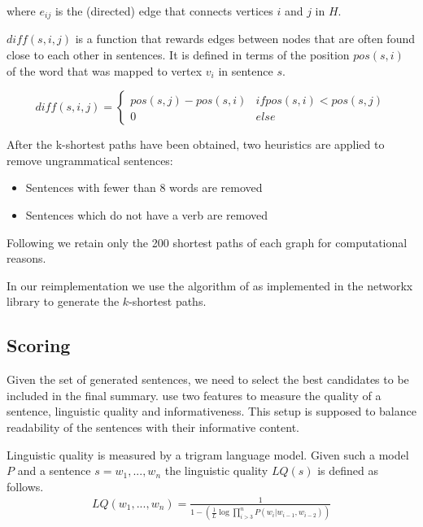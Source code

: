 \documentclass[a4paper,BCOR=10mm]{report}
\numberwithin{lemma}{chapter}
\numberwithin{definition}{chapter}
\begin{document}
where $e_{ij}$ is the (directed) edge that connects vertices $i$ and $j$ in $H$.

$\mathit{diff}(s, i, j)$ is a function that rewards edges between nodes that are often found close to each other in sentences. It is defined in terms of the position $\mathit{pos}(s, i)$ of the word that was mapped to vertex $v_i$ in sentence $s$.

\begin{equation}
\mathit{diff}(s, i, j) = \begin{cases}
\mathit{pos}(s, j) - \mathit{pos}(s, i) & \mathit{if }\mathit{pos}(s, i) < \mathit{pos}(s, j) \\
0 & \mathit{else}
\end{cases}
\end{equation}

After the k-shortest paths have been obtained, two heuristics are applied to remove ungrammatical sentences:

\begin{itemize}
    \item {Sentences with fewer than $8$ words are removed}
    \item {Sentences which do not have a verb are removed}
\end{itemize}

Following \citet{banerjee} we retain only the 200 shortest paths of each graph for computational reasons.

In our reimplementation we use the algorithm of \citet{kshortestpath} as implemented in the networkx library \citep{networkx} to generate the $k$-shortest paths.

\subsection{Scoring} \label{sec:baseline-scoring}

Given the set of generated sentences, we need to select the best candidates to be included in the final summary. \citet{banerjee} use two features to measure the quality of a sentence, linguistic quality and informativeness. This setup is supposed to balance readability of the sentences with their informative content.

Linguistic quality is measured by a trigram language model. Given such a model $P$ and a sentence $s = w_1, ..., w_n$ the linguistic quality $LQ(s)$ is defined as follows.
\begin{align}
LQ(w_1, ..., w_n) = \frac{1}{1 - (\frac{1}{L} \log \prod_{i > 3}^{n} P(w_i | w_{i - 1}, w_{i - 2}))}
\end{align}
\end{document}
